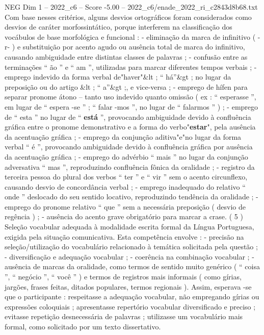\begin{textsample}{NEG Dim 1 – 2022\_c6 – Score -5.00 – 2022\_c6/enade\_2022\_ri\_c2843d8b68.txt}
Com base nesses critérios, alguns desvios ortográficos foram considerados como desvios de caráter morfossintático, porque interferem na classificação dos vocábulos de base morfológica e funcional : - eliminação da marca de infinitivo ( -r- ) e substituição por acento agudo ou ausência total de marca do infinitivo, causando ambiguidade entre distintas classes de palavras ; - confusão entre as terminações “ ão ” e “ am ”, utilizadas para marcar diferentes tempos verbais ; - emprego indevido da forma verbal de"haver"\&lt ; “ há”\&gt ; no lugar da preposição ou do artigo \&lt ; “ a”\&gt ;, e vice-versa ; - emprego de hífen para separar pronome átono – tanto uso indevido quanto omissão ( ex : “ esperasse ”, em lugar de “ espera -se ” ; “ falar -mos ”, no lugar de “ falarmos ” ) ; - emprego de “ esta ” no lugar de “ \textbf{está} ”, provocando ambiguidade devido à confluência gráfica entre o pronome demonstrativo e a forma do verbo"\textbf{estar}", pela ausência da acentuação gráfica ; - emprego da conjunção aditiva"e"no lugar da forma verbal “ é ”, provocando ambiguidade devido à confluência gráfica por ausência da acentuação gráfica ; - emprego do advérbio “ mais ” no lugar da conjunção adversativa “ mas ”, reproduzindo confluência fônica da oralidade ; - registro da terceira pessoa do plural dos verbos “ ter ” e “ vir ” sem o acento circunflexo, causando desvio de concordância verbal ; - emprego inadequado do relativo “ onde ” deslocado do seu sentido locativo, reproduzindo tendência da oralidade ; - emprego do pronome relativo “ que ” sem a necessária preposição ( desvio de regência ) ; - ausência do acento grave obrigatório para marcar a crase. ( 5 ) Seleção vocabular adequada à modalidade escrita formal da Língua Portuguesa, exigida pela situação comunicativa.
Esta competência envolve : - precisão na seleção/utilização do vocabulário relacionado à temática solicitada pela questão ; - diversificação e adequação vocabular ; - coerência na combinação vocabular ; - ausência de marcas da oralidade, como termos de sentido muito genérico ( “ coisa ”, “ negócio ”, “ você ” ) e termos de registros mais informais ( como gírias, jargões, frases feitas, ditados populares, termos regionais ).
Assim, esperava -se que o participante : respeitasse a adequação vocabular, não empregando gírias ou expressões coloquiais ; apresentasse repertório vocabular diversificado e preciso ; evitasse repetição desnecessária de palavras ; utilizasse um vocabulário mais formal, como solicitado por um texto dissertativo.

\end{textsample}

